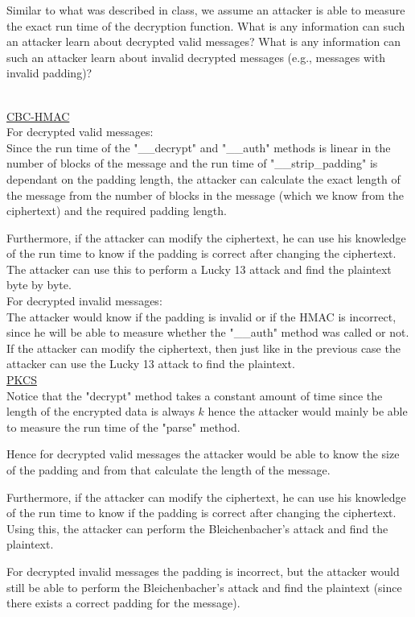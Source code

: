 \documentclass{article}
\title{
    \textmd{\bd{\hmwkClass:\ \\ \hmwkTitle}}\\
}
\author{\hmwkAuthorName}
\begin{document}
\maketitle

 \\
Similar to what was described in class, we assume an attacker is able to
measure the exact run time of the decryption function.
What is any information can  such an attacker learn about decrypted valid messages?
What is any information can such an attacker learn about invalid decrypted messages (e.g.,
messages with invalid padding)? \\ \\


\underline{CBC-HMAC} \\
For decrypted valid messages: \\
Since the run time of the "\_\_decrypt" and "\_\_auth" methods is linear
in the number of blocks of the message and the run time of "\_\_strip\_padding"
is dependant on the padding length, the attacker can calculate the exact length
of the message from the number of blocks in the message (which we know from the ciphertext)
and the required padding length.

Furthermore, if the attacker can modify the ciphertext, he can use his knowledge of the run time
to know if the padding is correct after changing the ciphertext. The attacker can use this to
perform a Lucky 13 attack and find the plaintext byte by byte. \\

For decrypted invalid messages: \\
The attacker would know if the padding is invalid or if the HMAC is incorrect,
since he will be able to measure whether the "\_\_auth" method was called or not. \\
If the attacker can modify the ciphertext, then just like in the previous case the attacker
can use the Lucky 13 attack to find the plaintext. \\

\underline{PKCS} \\
Notice that the "decrypt" method takes a constant amount of time since the length of the encrypted data is always $k$
hence the attacker would mainly be able to measure the run time of the "parse" method.

Hence for decrypted valid messages the attacker would be able to know the size of the padding and from
that calculate the length of the message.

Furthermore, if the attacker can modify the ciphertext, he can use his knowledge of the run time
to know if the padding is correct after changing the ciphertext. Using this, the attacker can perform
the Bleichenbacher's attack and find the plaintext.

For decrypted invalid messages the padding is incorrect, but the attacker would still be able to perform
the Bleichenbacher's attack and find the plaintext (since there exists a correct padding for the message).
\end{document}
